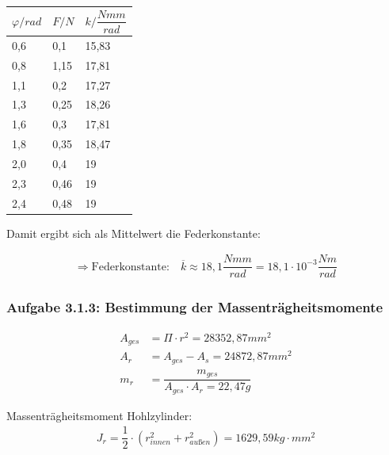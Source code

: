 \documentclass[a4paper]{scrartcl}
\numberwithin{equation}{subsection}
\begin{document}
\begin{table}[H]
\begin{tabular}{|l|l|l|}
\hline
\textbf{$\varphi/rad$} & \textbf{$F/N$} & \textbf{$k/\dfrac{Nmm}{rad}$} \\ \hline
0,6                    & 0,1            & 15,83                         \\ \hline
0,8                    & 1,15           & 17,81                         \\ \hline
1,1                    & 0,2            & 17,27                         \\ \hline
1,3                    & 0,25           & 18,26                         \\ \hline
1,6                    & 0,3            & 17,81                         \\ \hline
1,8                    & 0,35           & 18,47                         \\ \hline
2,0                    & 0,4            & 19                            \\ \hline
2,3                    & 0,46           & 19                            \\ \hline
2,4                    & 0,48           & 19                            \\ \hline
\end{tabular}
\centering
\end{table}

Damit ergibt sich als Mittelwert die Federkonstante:

\begin{align*}
\Rightarrow \text{Federkonstante:} \quad \overline{k} \approx 18,1 \dfrac{Nmm}{rad} = 18,1 \cdot 10^{-3} \dfrac{Nm}{rad}
\end{align*}

\subsubsection{Aufgabe 3.1.3: Bestimmung der Massenträgheitsmomente}

\begin{align}
A_{ges} &= \Pi \cdot r^2 = 28352,87mm^2 \\
A_r &= A_{ges} - A_s = 24872,87mm^2 \\
m_r &= \dfrac{m_{ges}}{A_{ges} \cdot A_r = 22,47g}
\end{align}

Massenträgheitsmoment Hohlzylinder:
\begin{align}
J_r = \dfrac{1}{2} \cdot (r_{\textit{innen}}^2 + r_{\textit{außen}}^2) = 1629,59 kg \cdot mm^2
\end{align}
\end{document}

